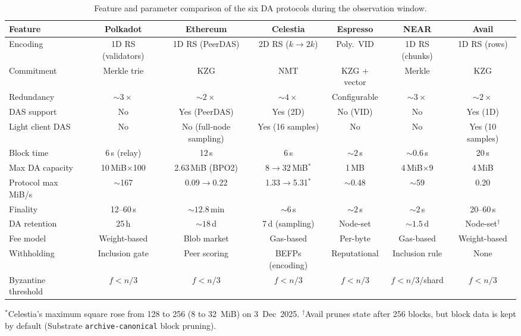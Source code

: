 
\begin{table}[t]
\centering
\caption{Feature and parameter comparison of the six DA protocols during the observation window.}
\label{tab:feature_comparison}
\setlength{\tabcolsep}{1.8pt}
\renewcommand{\arraystretch}{1.15}
\footnotesize
\begin{tabular}{l c c c c c c}
\toprule
\textbf{Feature} & \textbf{Polkadot} & \textbf{Ethereum} & \textbf{Celestia} & \textbf{Espresso} & \textbf{NEAR} & \textbf{Avail} \\
\midrule
Encoding &
  1D RS (validators) &
  1D RS (PeerDAS) &
  2D RS ($k{\to}2k$) &
  Poly.\ VID &
  1D RS (chunks) &
  1D RS (rows) \\
Commitment &
  Merkle trie &
  KZG &
  NMT &
  KZG + vector &
  Merkle &
  KZG \\
Redundancy &
  ${\sim}3\times$ &
  ${\sim}2\times$ &
  ${\sim}4\times$ &
  Configurable &
  ${\sim}3\times$ &
  ${\sim}2\times$ \\
DAS support &
  No &
  Yes (PeerDAS) &
  Yes (2D) &
  No (VID) &
  No &
  Yes (1D) \\
Light client DAS &
  No &
  No (full-node sampling) &
  Yes (16 samples) &
  No &
  No &
  Yes (10 samples) \\
Block time &
  6\,s (relay) &
  12\,s &
  6\,s &
  ${\sim}2$\,s &
  ${\sim}0.6$\,s &
  20\,s \\
Max DA capacity &
  10\,MiB$\times$100 &
  2.63\,MiB (BPO2) &
  8$\to$32\,MiB$^\ast$ &
  1\,MB &
  4\,MiB$\times$9 &
  4\,MiB \\
Protocol max MiB/s & $\sim$167 & 0.09$\to$0.22 & 1.33$\to$5.31$^\ast$ & $\sim$0.48 & $\sim$59 & 0.20 \\
Finality &
  12--60\,s &
  ${\sim}12.8$\,min &
  ${\sim}6$\,s &
  ${\sim}2$\,s &
  ${\sim}2$\,s &
  20--60\,s \\
DA retention &
  25\,h &
  ${\sim}18$\,d &
  7\,d (sampling) &
  Node-set &
  ${\sim}1.5$\,d &
  Node-set$^\dagger$ \\
Fee model &
  Weight-based &
  Blob market &
  Gas-based &
  Per-byte &
  Gas-based &
  Weight-based \\
Withholding &
  Inclusion gate &
  Peer scoring &
  BEFPs (encoding) &
  Reputational &
  Inclusion rule &
  None \\
Byzantine threshold &
  $f < n/3$ &
  $f < n/3$ &
  $f < n/3$ &
  $f < n/3$ &
  $f<n/3$/shard &
  $f < n/3$ \\
\bottomrule
\end{tabular}

\vspace{2pt}
\raggedright\footnotesize{$^\ast$Celestia's maximum square rose from 128 to 256 (8 to 32~MiB) on 3~Dec~2025. $^\dagger$Avail prunes state after 256 blocks, but block data is kept by default (Substrate \texttt{archive-canonical} block pruning).}
\end{table}

